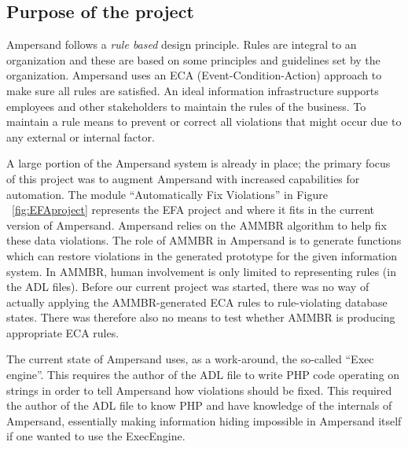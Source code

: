 %

\subsection{Purpose of the project}

Ampersand follows a \emph{rule based} design principle. Rules are integral to an organization
and these are based on some principles and guidelines set by the organization.
Ampersand uses an ECA (Event-Condition-Action) approach to make sure all rules are satisfied. An ideal information infrastructure supports employees and other stakeholders to maintain the rules of the business. To maintain a rule means to prevent or correct all violations that might occur due to any external or internal factor.
 
 A large portion of the Ampersand system is already in place; the primary focus of this project was to
augment Ampersand with increased capabilities for automation. The module ``Automatically Fix Violations'' in Figure ~\ref{fig:EFAproject} represents the EFA project and where it fits in the current version of Ampersand.
Ampersand relies on the AMMBR \citep{Ampersand} algorithm to help fix these data violations. 
The role 
of AMMBR in Ampersand is to generate functions which can restore violations
in the generated prototype for the given information system. In AMMBR, human involvement is only limited 
to representing rules (in the ADL files). Before our current project was started, there was no way of actually
applying the AMMBR-generated ECA rules to rule-violating database states.
There was therefore also no means to test whether AMMBR is producing
appropriate ECA rules.

The current state of Ampersand uses, as a work-around, the so-called
``Exec engine''. This requires the author of the ADL file 
to write PHP code operating on strings in order to tell Ampersand
how violations should be fixed. This required the author of the 
ADL file to know PHP and have knowledge of the internals of Ampersand,
essentially making information hiding impossible in Ampersand itself if one wanted to use
the ExecEngine. 
 
